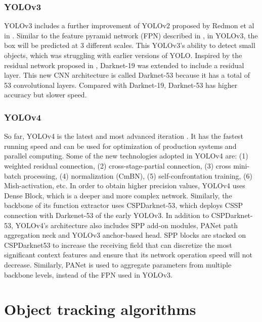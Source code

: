 \subsubsection{YOLOv3}
YOLOv3 includes a further improvement of YOLOv2 proposed by Redmon et al in \cite{DBLP:journals/corr/abs-1804-02767}. Similar to the feature pyramid network (FPN) described in \cite{DBLP:journals/corr/LinDGHHB16}, in YOLOv3, the box will be predicted at 3 different scales. This YOLOv3's ability to detect small objects, which was struggling with earlier versions of YOLO.
Inspired by the residual network proposed in \cite{DBLP:journals/corr/HeZRS15}, Darknet-19 was extended to include a residual layer. This new CNN architecture is called Darknet-53 because it has a total of 53 convolutional layers. Compared with Darknet-19, Darknet-53 has higher accuracy but slower speed.
\vspace{-1.6cm}
\subsubsection{YOLOv4}
So far, YOLOv4 is the latest and most advanced iteration \cite{bochkovskiy2020yolov4}. It has the fastest running speed and can be used for optimization of production systems and parallel computing. Some of the new technologies adopted in YOLOv4 are: (1) weighted residual connection, (2) cross-stage-partial connection, (3) cross mini-batch processing, (4) normalization (CmBN), (5) self-confrontation training, (6) Mish-activation, etc. In order to obtain higher precision values, YOLOv4 uses Dense Block, which is a deeper and more complex network. Similarly, the backbone of its function extractor uses CSPDarknet-53, which deploys CSSP connection with Darkenet-53 of the early YOLOv3. In addition to CSPDarknet-53, YOLOv4's architecture also includes SPP add-on modules, PANet path aggregation neck and YOLOv3 anchor-based head. SPP blocks are stacked on CSPDarknet53 to increase the receiving field that can discretize the most significant context features and ensure that its network operation speed will not decrease. Similarly, PANet is used to aggregate parameters from multiple backbone levels, instead of the FPN used in YOLOv3.
\section{Object tracking algorithms}
